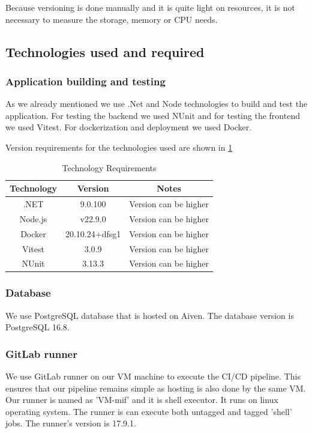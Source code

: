 \documentclass[]{VUMIFTemplateClass}
\begin{document}
Because versioning is done manually and it is quite light on resources, it is not necessary to measure the storage, memory or CPU needs.

\subsection{Technologies used and required}
\subsubsection{Application building and testing}
As we already mentioned we use .Net and Node technologies to build and test the application. For testing the backend we used NUnit and for testing the frontend we used Vitest.
For dockerization and deployment we used Docker.

Version requirements for the technologies used are shown in \ref{tab:technology-requirements}
\begin{table}[H]
    \centering
    \begin{tabular}{|c|c|c|}
        \hline
        \textbf{Technology} & \textbf{Version} & \textbf{Notes} \\ 
        \hline
        .NET & 9.0.100 & Version can be higher \\ 
        \hline
        Node.js & v22.9.0 & Version can be higher \\ 
        \hline
        Docker & 20.10.24+dfsg1 & Version can be higher \\ 
        \hline
        Vitest & 3.0.9 & Version can be higher \\
        \hline 
        NUnit & 3.13.3 & Version can be higher \\       
        \hline
    \end{tabular}
    \caption{Technology Requirements}
    \label{tab:technology-requirements}
\end{table}

\subsubsection{Database}
We use PostgreSQL database that is hosted on Aiven. The database version is PostgreSQL 16.8.

\subsubsection{GitLab runner}
We use GitLab runner on our VM machine to execute the CI/CD pipeline. This ensures that our pipeline remains simple as hosting is also done by the same VM. Our runner is named as 'VM-mif' and it is shell executor.
It runs on linux operating system. The runner is can execute both untagged and tagged 'shell' jobs. The runner's version is 17.9.1.
\end{document}
